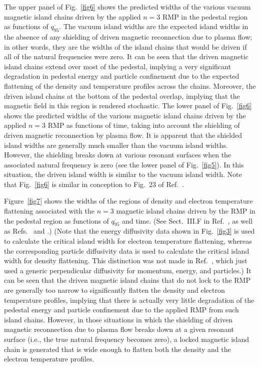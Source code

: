 \documentclass[12pt,prb,aps]{revtex4-1}
\begin{document}
The upper panel of Fig.~\ref{fig6} shows the predicted widths of the various vacuum magnetic island chains driven by the applied $n=3$ RMP in the pedestal region as functions of $
\overline{q_{95}}$.
The vacuum island widths are the  expected island widths in the absence of any shielding of driven magnetic reconnection due to
plasma flow; in other words, they are the  widths of the island chains that would be driven if all of the natural frequencies were zero. It can be seen that
the driven magnetic island chains extend over most of the pedestal, implying a very significant degradation in pedestal energy and particle confinement due to the
expected flattening of the density and temperature profiles across the chains. Moreover, the driven island chains at the
bottom of the pedestal overlap, implying that the magnetic field in this region is rendered stochastic. The lower panel
of Fig.~\ref{fig6} shows the predicted widths of the various magnetic island chains driven by the applied $n=3$ RMP as functions of time, taking into
account the shielding of driven magnetic reconnection by plasma flow. It is apparent 
that the shielded island widths are generally much smaller than the vacuum island widths. However, the shielding breaks down at various resonant surfaces when the associated natural frequency is zero (see the lower panel of
Fig.~\ref{fig5}). In this situation, the driven island width is similar to the vacuum island width. Note that Fig.~\ref{fig6} is similar in conception to
Fig.~23 of Ref.~. 

Figure~\ref{fig7} shows the widths of the regions of density and electron temperature flattening associated with the $n=3$ magnetic
island chains driven by the RMP in the pedestal region as functions of $\overline{q_{95}}$ and time. (See Sect.~III.F in Ref.~, as well as
Refs.~ and .) (Note that the energy diffusivity data shown in Fig.~\ref{fig3}  is used to calculate the
critical island width for electron temperature flattening, whereas the corresponding particle diffusivity data is used to calculate
the critical island width for density flattening.\cite{flat} This distinction was not made in Ref.~, which just used a
generic perpendicular diffusivity for momentum, energy, and particles.) It can be seen that the driven magnetic island chains that do not lock to the RMP are generally too narrow
to significantly flatten the density and electron temperature profiles,  implying that there is actually very little degradation of the pedestal energy and particle confinement
due to the applied RMP from such island chains. 
However, in those situations in which the shielding of driven
magnetic reconnection due to plasma flow breaks down at a given resonant surface (i.e., the true natural frequency becomes zero), a locked magnetic island chain is generated that is
 wide enough to flatten both the density and the electron temperature profiles. 
 
\end{document}
